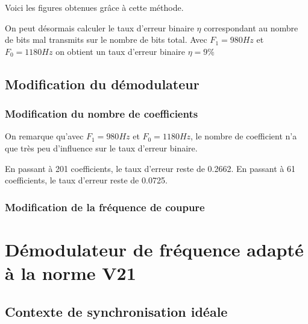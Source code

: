 \documentclass{article}
\begin{document}
Voici les figures obtenues grâce à cette méthode.


On peut désormais calculer le taux d'erreur binaire $\eta$ correspondant au nombre de bits mal transmits sur le nombre de bits total.
Avec $F_1=980Hz$ et $F_0=1180Hz$ on obtient un taux d'erreur binaire $\eta=9\%$
\subsection{Modification du démodulateur} 

\subsubsection{Modification du nombre de coefficients}

On remarque qu'avec $F_1=980Hz$ et $F_0=1180Hz$, le nombre de coefficient n'a que très peu d'influence sur le taux d'erreur binaire.

En passant à 201 coefficients, le taux d'erreur reste de 0.2662.
En passant à 61 coefficients, le taux d'erreur reste de 0.0725. 





\subsubsection{Modification de la fréquence de coupure}



\section{Démodulateur de fréquence adapté à la norme V21}

\subsection{Contexte de synchronisation idéale}
\label{synchro-ideale}
\end{document}
